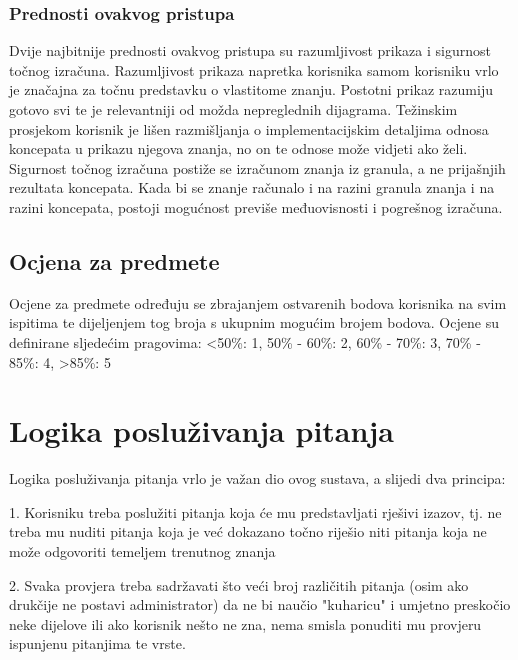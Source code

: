 \documentclass[times, utf8, zavrsni, numeric]{fer}
\begin{document}
\subsubsection{Prednosti ovakvog pristupa}
Dvije najbitnije prednosti ovakvog pristupa su razumljivost prikaza i sigurnost točnog izračuna. Razumljivost prikaza napretka korisnika samom korisniku vrlo je značajna za točnu predstavku o vlastitome znanju. Postotni prikaz razumiju gotovo svi te je relevantniji od možda nepreglednih dijagrama. Težinskim prosjekom korisnik je lišen razmišljanja o implementacijskim detaljima odnosa koncepata u prikazu njegova znanja, no on te odnose može vidjeti ako želi.
Sigurnost točnog izračuna postiže se izračunom znanja iz granula, a ne prijašnjih rezultata koncepata. Kada bi se znanje računalo i na razini granula znanja i na razini koncepata, postoji mogućnost previše međuovisnosti i pogrešnog izračuna.

\subsection{Ocjena za predmete}
Ocjene za predmete određuju se zbrajanjem ostvarenih bodova korisnika na svim ispitima te dijeljenjem tog broja s ukupnim mogućim brojem bodova.
Ocjene su definirane sljedećim pragovima:
\newline
<50\%: 1, 
50\% - 60\%: 2, 
60\% - 70\%: 3, 
70\% - 85\%: 4, 
>85\%: 5

\section{Logika posluživanja pitanja}
Logika posluživanja pitanja vrlo je važan dio ovog sustava, a slijedi dva principa:
\par
1. Korisniku treba poslužiti pitanja koja će mu predstavljati rješivi izazov, tj. ne treba mu nuditi pitanja koja je već dokazano točno riješio niti pitanja koja ne može odgovoriti temeljem trenutnog znanja
\par
2. Svaka provjera treba sadržavati što veći broj različitih pitanja (osim ako drukčije ne postavi administrator) da ne bi naučio "kuharicu" i umjetno preskočio neke dijelove ili ako korisnik nešto ne zna, nema smisla ponuditi mu provjeru ispunjenu pitanjima te vrste.
\end{document}
